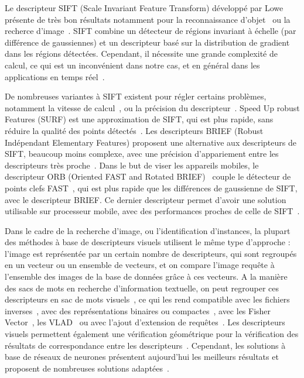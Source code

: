 Le descripteur SIFT (Scale Invariant Feature Transform) développé par Lowe~\cite{lowe1999object} présente de très bon résultats notamment pour la reconnaissance d'objet~\cite{lowe2004distinctive, ferrari2004simultaneous, mikolajczyk2005performance, karami2017image} ou la recherce d'image~\cite{mikolajczyk2001indexing}.
SIFT combine un détecteur de régions invariant à échelle (par différence de gaussiennes) et un descripteur basé sur la distribution de gradient dans les régions détectées.
Cependant, il nécessite une grande complexité de calcul, ce qui est un inconvénient dans notre cas, et en général dans les applications en temps réel~\cite{lowe2004distinctive, juan2009comparison}. 


De nombreuses variantes à SIFT existent pour régler certains problèmes, notamment la vitesse de calcul~\cite{chiu2013fast}, ou la précision du descripteur~\cite{ke2004pca}.
Speed Up robust Features (SURF) est une approximation de SIFT, qui  est plus rapide, sans réduire la qualité des points détectés~\cite{bay2008speeded}.
Les descripteurs BRIEF (Robust Indépendant Elementary Features) proposent une alternative aux descripteurs de SIFT, beaucoup moins complexe, avec une précision d'appariement entre les descripteurs très proche~\cite{calonder2010brief}.
Dans le but de viser les appareils mobiles, le descripteur ORB (Oriented FAST and Rotated BRIEF)~\cite{rublee2011orb} couple le détecteur de points clefs FAST~\cite{rosten2006machine}, qui est plus rapide que les différences de gaussienne de SIFT, avec le descripteur BRIEF.
Ce dernier descripteur permet d'avoir une solution utilisable sur processeur mobile, avec des performances proches de celle de SIFT~\cite{rublee2011orb}.

Dans le cadre de la recherche d'image, ou l'identification d'instances, la plupart des méthodes à base de descripteurs visuels utilisent le même type d'approche : l'image est représentée par un certain nombre de descripteurs, qui sont regroupés en un vecteur ou un ensemble de vecteurs, et on compare l'image requête à l'ensemble des images de la base de données grâce à ces vecteurs.
A la manière des sacs de mots en recherche d'information textuelle, on peut regrouper ces descripteurs en sac de mots visuels~\cite{sivic2003video}, ce qui les rend compatible avec les fichiers inverses~\cite{zhang2011image}, avec des représentations binaires ou compactes~\cite{nister2006scalable,philbin2007object,jegou2008hamming}, avec les Fisher Vector~\cite{perronnin2010large}, les VLAD~\cite{jegou2010aggregating} ou avec l'ajout d'extension de requêtes~\cite{chum2007total, arandjelovic_three_2012}. 
Les descripteurs visuels permettent également une vérification géométrique pour la vérification des résultats de correspondance entre les descripteurs~\cite{philbin2007object, perd2009efficient}.
Cependant, les solutions à base de réseaux de neurones présentent aujourd'hui les meilleurs résultats et proposent de nombreuses solutions adaptées~\cite{zheng2018sift}.



